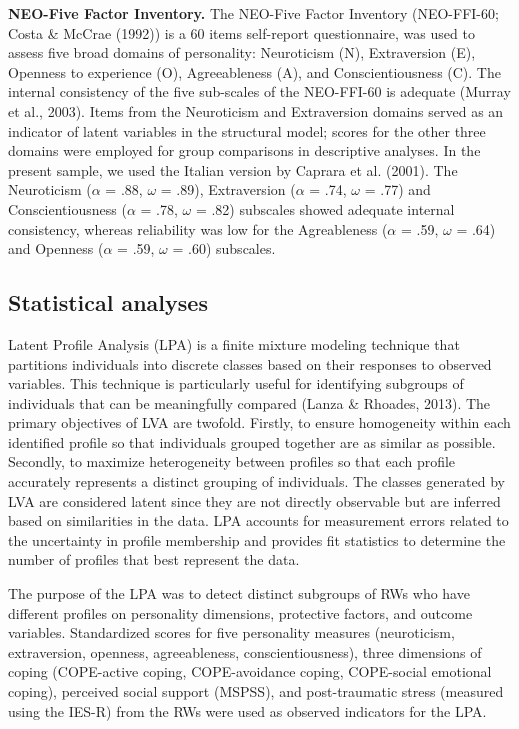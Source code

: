 \documentclass[
]{apa7}
\begin{document}
\textbf{NEO-Five Factor Inventory.} The NEO-Five Factor Inventory
(NEO-FFI-60; Costa \& McCrae (1992)) is a 60 items self-report
questionnaire, was used to assess five broad domains of personality:
Neuroticism (N), Extraversion (E), Openness to experience (O),
Agreeableness (A), and Conscientiousness (C). The internal consistency
of the five sub-scales of the NEO-FFI-60 is adequate (Murray et al.,
2003). Items from the Neuroticism and Extraversion domains served as an
indicator of latent variables in the structural model; scores for the
other three domains were employed for group comparisons in descriptive
analyses. In the present sample, we used the Italian version by Caprara
et al. (2001). The Neuroticism (\(\alpha\) = .88, \(\omega\) = .89),
Extraversion (\(\alpha\) = .74, \(\omega\) = .77) and Conscientiousness
(\(\alpha\) = .78, \(\omega\) = .82) subscales showed adequate internal
consistency, whereas reliability was low for the Agreableness
(\(\alpha\) = .59, \(\omega\) = .64) and Openness (\(\alpha\) = .59,
\(\omega\) = .60) subscales.

\hypertarget{statistical-analyses}{%
\subsection{Statistical analyses}\label{statistical-analyses}}

Latent Profile Analysis (LPA) is a finite mixture modeling technique
that partitions individuals into discrete classes based on their
responses to observed variables. This technique is particularly useful
for identifying subgroups of individuals that can be meaningfully
compared (Lanza \& Rhoades, 2013). The primary objectives of LVA are
twofold. Firstly, to ensure homogeneity within each identified profile
so that individuals grouped together are as similar as possible.
Secondly, to maximize heterogeneity between profiles so that each
profile accurately represents a distinct grouping of individuals. The
classes generated by LVA are considered latent since they are not
directly observable but are inferred based on similarities in the data.
LPA accounts for measurement errors related to the uncertainty in
profile membership and provides fit statistics to determine the number
of profiles that best represent the data.

The purpose of the LPA was to detect distinct subgroups of RWs who have
different profiles on personality dimensions, protective factors, and
outcome variables. Standardized scores for five personality measures
(neuroticism, extraversion, openness, agreeableness, conscientiousness),
three dimensions of coping (COPE-active coping, COPE-avoidance coping,
COPE-social emotional coping), perceived social support (MSPSS), and
post-traumatic stress (measured using the IES-R) from the RWs were used
as observed indicators for the LPA.
\end{document}
